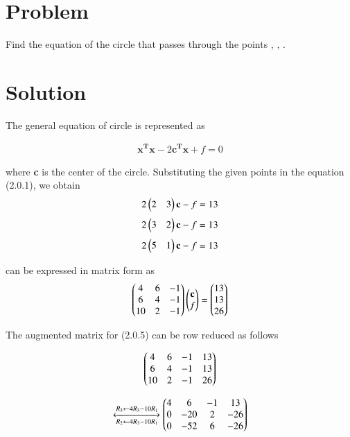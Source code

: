 \documentclass[journal,12pt,twocolumn]{IEEEtran}
\begin{document}
\section{Problem}
Find the equation of the circle that passes through the points 
 , , .  

\section{Solution}

The general equation of circle is represented as 

\begin{align}
    \boldsymbol{{x^{T}}x}-2\boldsymbol{{c^{T}}x} + f = 0
\end{align}

where \textbf{c} is the center of the circle. Substituting the given points in the equation (2.0.1), we obtain
\begin{align}
2\begin{pmatrix}2&3\end{pmatrix}\textbf{c} - f = 13
\end{align}
\begin{align}
2\begin{pmatrix}3&2\end{pmatrix}\textbf{c} - f = 13
\end{align}
\begin{align}
2\begin{pmatrix}5&1\end{pmatrix}\textbf{c} - f = 13
\end{align}

can be expressed in matrix form as 
\begin{align}
\begin{pmatrix}4&6&-1\\6&4&-1\\10&2&-1\end{pmatrix}\begin{pmatrix}\textbf{c}\\f\end{pmatrix} = \begin{pmatrix}13\\13\\26\end{pmatrix}
\end{align}

The augmented matrix for (2.0.5) can be row reduced as follows

\begin{align}
\begin{pmatrix}4&6&-1&13\\6&4&-1&13\\10&2&-1&26\end{pmatrix}
\end{align}

\begin{align}
\xleftrightarrow[R_2\leftarrow4R_3-10R_1]{R_3\leftarrow4R_3 - 10R_1}\begin{pmatrix}4&6&-1&13\\0&-20&2&-26\\0&-52&6&-26\end{pmatrix}
\end{align}
\end{document}
